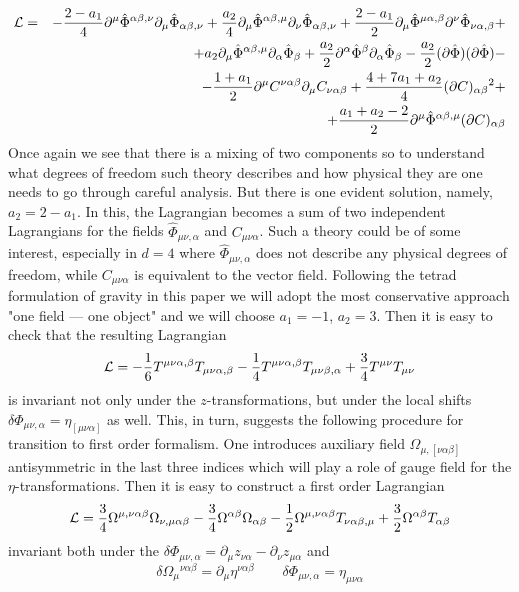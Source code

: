 \documentclass[a4paper,12pt]{article}
\begin{document}
\begin{eqnarray}
{\cal L} &=& - \frac{2-a_1}{4} \partial^\mu
\hat{\Phi}^{\alpha\beta,\nu} \partial_\mu \hat{\Phi}_{\alpha\beta,\nu}
+ \frac{a_2}{4} \partial_\mu \hat{\Phi}^{\alpha\beta,\mu} \partial_\nu
\hat{\Phi}_{\alpha\beta,\nu} + \frac{2-a_1}{2} \partial_\mu
\hat{\Phi}^{\mu\alpha,\beta} \partial^\nu \hat{\Phi}_{\nu\alpha,\beta}
+ \nonumber \\
 && + a_2 \partial_\mu \hat{\Phi}^{\alpha\beta,\mu} \partial_\alpha
\hat{\Phi}_\beta + \frac{a_2}{2} \partial^\alpha \hat{\Phi}^\beta
\partial_\alpha \hat{\Phi}_\beta - \frac{a_2}{2}
(\partial \hat{\Phi})  (\partial \hat{\Phi}) - \nonumber \\
 && - \frac{1+a_1}{2} \partial^\mu C^{\nu\alpha\beta} \partial_\mu
C_{\nu\alpha\beta} + \frac{4+7a_1+a_2}{4}
(\partial C)_{\alpha\beta}{}^2 + \nonumber \\
 && + \frac{a_1+a_2-2}{2} \partial^\mu
\hat{\Phi}^{\alpha\beta,\mu} (\partial C)_{\alpha\beta}
\end{eqnarray}
Once again we see that there is a mixing of two components so to
understand what degrees of freedom such theory describes and how
physical they are one needs to go through careful analysis. But there
is one evident solution, namely, $a_2 = 2 - a_1$. In this, the
Lagrangian becomes a sum of two independent Lagrangians for the fields
$\hat{\Phi}_{\mu\nu,\alpha}$ and $C_{\mu\nu\alpha}$. Such a theory
could be of some interest, especially in $d=4$ where
$\hat{\Phi}_{\mu\nu,\alpha}$ does not describe any physical degrees
of freedom, while $C_{\mu\nu\alpha}$ is equivalent to the vector
field. Following the tetrad formulation of gravity in this paper we
will adopt the most conservative approach "one field --- one object"
and we will choose $a_1 = -1$, $a_2 = 3$. Then it is easy to check
that the resulting Lagrangian
\begin{equation}
{\cal L} = - \frac{1}{6} T^{\mu\nu\alpha,\beta} T_{\mu\nu\alpha,\beta}
- \frac{1}{4} T^{\mu\nu\alpha,\beta} T_{\mu\nu\beta,\alpha} +
\frac{3}{4} T^{\mu\nu} T_{\mu\nu}
\end{equation}
is invariant not only under the $z$-transformations, but under
the local shifts $\delta \Phi_{\mu\nu,\alpha} = \eta_{[\mu\nu\alpha]}$
as well. This, in turn, suggests the following procedure for
transition to first order formalism. One introduces auxiliary field
$\Omega_{\mu,[\nu\alpha\beta]}$ antisymmetric in the last three
indices which will play a role of gauge field for the
$\eta$-transformations. Then it is easy to construct a first order
Lagrangian
\begin{equation}
{\cal L} = \frac{3}{4} \Omega^{\mu,\nu\alpha\beta}
\Omega_{\nu,\mu\alpha\beta} - \frac{3}{4} \Omega^{\alpha\beta}
\Omega_{\alpha\beta} - \frac{1}{2} \Omega^{\mu,\nu\alpha\beta}
T_{\nu\alpha\beta,\mu} + \frac{3}{2} \Omega^{\alpha\beta}
T_{\alpha\beta}
\end{equation}
invariant both under the $\delta \Phi_{\mu\nu,\alpha} = \partial_\mu
z_{\nu\alpha} - \partial_\nu z_{\mu\alpha}$ and
\begin{equation}
\delta \Omega_\mu{}^{\nu\alpha\beta} = \partial_\mu
\eta^{\nu\alpha\beta} \qquad \delta \Phi_{\mu\nu,\alpha} =
\eta_{\mu\nu\alpha}
\end{equation}
\end{document}
